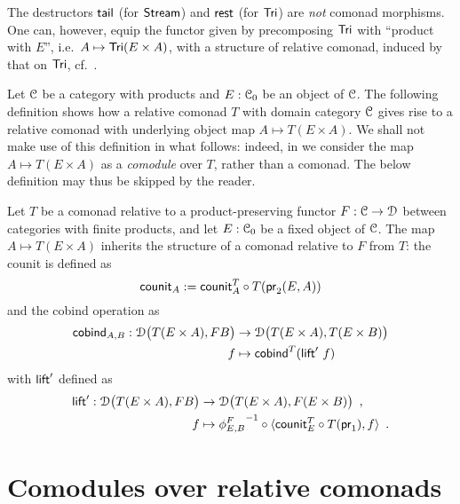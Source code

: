 \documentclass[a4paper,USenglish]{lipics}
\begin{document}
\begin{Long}

\begin{rem}
 The destructors $\stail$ (for $\stream$) and $\tail$ (for $\Tri$) are \emph{not} comonad morphisms.
 One can, however, equip the functor given by precomposing $\Tri$ with \enquote{product with $E$}, i.e.\
 $A \mapsto \Tri (E\times A)$, with a structure of relative comonad, induced by that
 on $\Tri$, cf.\ \Cref{product_comonad}.
\end{rem}

Let $\C$ be a category with products and $E:\C_0$ be an object of $\C$.
The following definition shows how a relative comonad $T$ with domain category $\C$ gives rise to a relative comonad with underlying object map
$A \mapsto T(E\times A)$.
We shall not make use of this definition in what follows: indeed, in  we consider the map $A\mapsto T(E\times A)$
as a \emph{comodule} over $T$, rather than a comonad. The below definition may thus be skipped by the reader.

\begin{defn}\label{product_comonad}
  Let $T$ be a comonad relative to a product-preserving functor $F:\C\to\D$ between categories with finite products,
  and let $E:\C_0$ be a fixed object of $\C$.
 The map $A\mapsto T(E\times A)$ inherits the structure of a comonad relative to $F$ from $T$: the 
 counit is defined as
   \[ \counit_A := \comp{T(\pr_2(E,A))}{\counit^T_{A}} \]
  and the cobind operation as
   \begin{align*} 
            \cobind_{A,B} : \D\bigl(T(E\times A),FB\bigr) &\to \D\bigl(T(E\times A),T(E\times B)\bigr) \\
              f &\mapsto  \cobind^T(\extend'~f)
   \end{align*}
  with $\extend'$ defined as 
  \begin{align*} \extend' : \D\bigl(T(E\times A),FB\bigr) &\to \D\bigl(T(E\times A), F(E\times B)\bigr) \enspace , \\ 
                                            f & \mapsto \comp{\langle \comp{T(\pr_1)}{\counit^T_E}, f \rangle}{{\phi^{F}_{E,B}}^{-1}} \enspace .
  \end{align*}
\end{defn}

\end{Long}



\section{Comodules over relative comonads}\label{sec:comodules}
\end{document}
